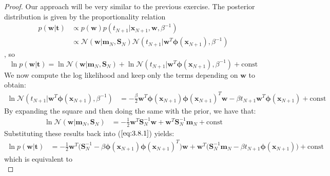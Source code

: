 \begin{proof}
    Our approach will be very similar to the previous exercise. The
    posterior distribution is given by the proportionality relation
    \begin{align*}
        p(\mathbf{w} | \mathbf{t}) 
        &\propto p(\mathbf{w}) p(t_{N + 1} | \mathbf{x}_{N + 1}, \mathbf{w}, \beta^{-1}) \\
        &\propto \mathcal{N}(\mathbf{w} | \mathbf{m}_N, \mathbf{S}_N) 
            \mathcal{N}(t_{N + 1} | \mathbf{w}^T\bm{\phi}(\mathbf{x}_{N + 1}), \beta^{-1})
    \end{align*}
    , so
    \begin{equation}\label{eq:3.8.1}\tag{3.8.1}
        \ln p(\mathbf{w} | \mathbf{t})
        = \ln \mathcal{N}(\mathbf{w} | \mathbf{m}_N, \mathbf{S}_N)
        + \ln \mathcal{N}(t_{N + 1} | \mathbf{w}^T\bm{\phi}(\mathbf{x}_{N + 1}), \beta^{-1})
        + \text{const}
    \end{equation}
    We now compute the log likelihood and keep only the terms depending on
    $\mathbf{w}$ to obtain:
    \begin{align*}
        \ln \mathcal{N}(t_{N + 1} | \mathbf{w}^T\bm{\phi}(\mathbf{x}_{N + 1}), \beta^{-1})
        &= - \frac{\beta}{2} \mathbf{w}^T \bm{\phi}(\mathbf{x}_{N + 1})\bm{\phi}(\mathbf{x}_{N + 1})^T             \mathbf{w}
            -\beta t_{N + 1} \mathbf{w}^T \bm{\phi}(\mathbf{x}_{N + 1})
            + \text{const}
    \end{align*}
    By expanding the square and then doing the same with the prior, we have that:
    \begin{align*}
        \ln \mathcal{N}(\mathbf{w} | \mathbf{m}_N, \mathbf{S}_{N})
        &= -\frac{1}{2} \mathbf{w}^T \mathbf{S}_N^{-1} \mathbf{w}
            + \mathbf{w}^T \mathbf{S}_N^{-1} \mathbf{m}_N 
            + \text{const}
    \end{align*}
    Substituting these results back into ($\ref{eq:3.8.1}$) yields:
    \begin{align*}
        \ln p(\mathbf{w} | \mathbf{t}) 
        &= -\frac{1}{2} \mathbf{w}^T
                \big(\mathbf{S}_N^{-1} - \beta \bm{\phi}(\mathbf{x}_{N + 1})\bm{\phi}
                (\mathbf{x}_{N + 1})^T\big) \mathbf{w}
            + \mathbf{w}^T \big(\mathbf{S}_N^{-1} \mathbf{m}_N 
                - \beta t_{N + 1} \bm{\phi}(\mathbf{x}_{N + 1})\big)
            + \text{const}
    \end{align*}
    which is equivalent to
    \begin{equation*}

\end{equation*}
\end{proof}
